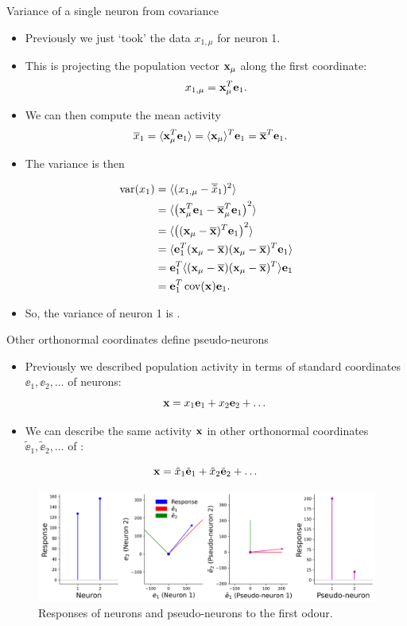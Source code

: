 \documentclass[presentation,smaller]{beamer}
\begin{document}
\begin{frame}[label={sec:org4529351}]{Variance of a single neuron from covariance}
\begin{itemize}
\item Previously we just `took' the data \(x_{1,\mu}\)  for neuron 1.
\item This is projecting the population vector \(\mathbf{x}_\mu\) along the first coordinate: $$x_{1,\mu} = \mathbf{x}_\mu^T \mathbf e_1.$$
\item We can then compute the mean activity
\begin{align*}
\overline{x}_1 &= \langle \mathbf{x}_\mu^T \mathbf e_1 \rangle = \langle \mathbf{x}_\mu \rangle^T \mathbf e_1 = \overline{\mathbf{x}}^T  \mathbf e_1.
\end{align*}
\item The variance is then
\end{itemize}
\begin{align*}
 \operatorname{var}(x_1) &= \langle (x_{1,\mu}- \overline{\tilde x}_1)^2 \rangle \\
&= \langle \left( \mathbf{x}_\mu^T \mathbf e_1  - \overline{\mathbf{x}}_\mu^T \mathbf e_1 \right)^2 \rangle\\
&= \langle \left( (\mathbf{x}_\mu - \overline{\mathbf{x}})^T\mathbf e_1 \right)^2 \rangle\\
&= \langle \mathbf e_1^T(\mathbf{x}_\mu - \overline{\mathbf{x}})  (\mathbf{x}_\mu - \overline{\mathbf{x}})^T\mathbf e_1  \rangle\\
&= \mathbf e_1^T \langle (\mathbf{x}_\mu - \overline{\mathbf{x}}) (\mathbf{x}_\mu - \overline{\mathbf{x}})^T \rangle \mathbf e_1\\
&= \mathbf e_1^T \operatorname{cov}(\mathbf{x}) \mathbf e_1.
\end{align*}
\begin{itemize}
\item So, the variance of neuron 1 is .
\end{itemize}
\end{frame}
\begin{frame}[label={sec:org4e2f92f}]{Other orthonormal coordinates define pseudo-neurons}
\begin{itemize}
\item Previously we described population activity in terms of standard coordinates \(\ee_1, \ee_2, \dots\) of neurons:
$$ \mathbf{x} = x_1 \mathbf e_1 + x_2 \mathbf e_2 + \dots $$
\item We can describe the same activity \(\mathbf{x}\) in other orthonormal coordinates \(\tilde \ee_1, \tilde \ee_2, \dots\) of :
\end{itemize}
$$ \mathbf{x} = \tilde x_1 \tilde {\mathbf e}_1 + \tilde x_2 \tilde {\mathbf e}_2 + \dots $$
\begin{figure}[htbp]
\centering
\includegraphics[width=1.0\textwidth]{figures/coordinate_transform.png}
\caption{Responses of neurons and pseudo-neurons to the first odour.}
\end{figure}
\end{frame}
\end{document}

